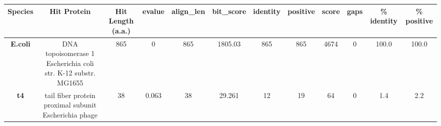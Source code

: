\begin{tabular}{|c|c|c|c|c|c|c|c|c|c|c|c|} \hline
\textbf{Species} & \textbf{Hit Protein} & \textbf{Hit Length (a.a.)} & \textbf{evalue} & \textbf{align\_len} & \textbf{bit\_score} & \textbf{identity} & \textbf{positive} & \textbf{score} & \textbf{gaps} & \textbf{\% identity} & \textbf{\% positive} \\ \hline
\textbf{E.coli} & DNA topoisomerase 1 Escherichia coli str. K-12 substr. MG1655 & 865 & 0 & 865 & 1805.03 & 865 & 865 & 4674 & 0 & 100.0 & 100.0\\
\textbf{t4} & tail fiber protein proximal subunit Escherichia phage  & 38 & 0.063 & 38 & 29.261 & 12 & 19 & 64 & 0 & 1.4 & 2.2\\
\hline \end{tabular}
